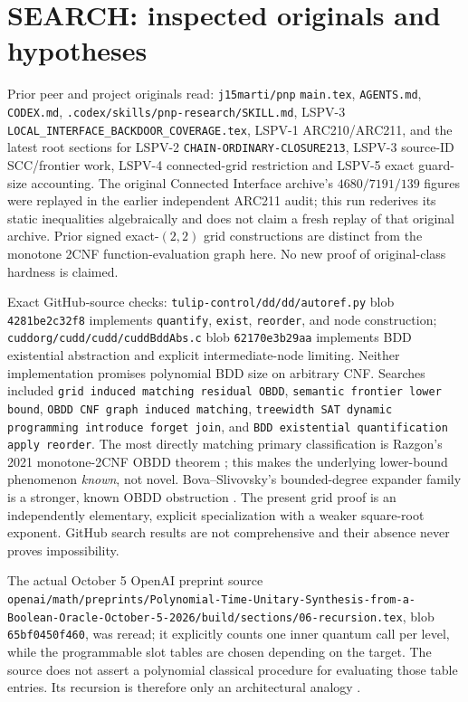 \documentclass[11pt]{article}
\begin{document}
\section{SEARCH: inspected originals and hypotheses}
\noindent Prior peer and project originals read: \texttt{j15marti/pnp} \texttt{main.tex}, \texttt{AGENTS.md}, \texttt{CODEX.md}, \texttt{.codex/skills/pnp-research/SKILL.md}, LSPV-3 \texttt{LOCAL\_INTERFACE\_BACKDOOR\_COVERAGE.tex}, LSPV-1 ARC210/ARC211, and the latest root sections for LSPV-2 \texttt{CHAIN-ORDINARY-CLOSURE213}, LSPV-3 source-ID SCC/frontier work, LSPV-4 connected-grid restriction and LSPV-5 exact guard-size accounting. The original Connected Interface archive's $4680/7191/139$ figures were replayed in the earlier independent ARC211 audit; this run rederives its static inequalities algebraically and does not claim a fresh replay of that original archive. Prior signed exact-$(2,2)$ grid constructions are distinct from the monotone 2CNF function-evaluation graph here. No new proof of original-class hardness is claimed.

\noindent Exact GitHub-source checks: \texttt{tulip-control/dd/dd/autoref.py} blob \texttt{4281be2c32f8} implements \texttt{quantify}, \texttt{exist}, \texttt{reorder}, and node construction; \texttt{cuddorg/cudd/cudd/cuddBddAbs.c} blob \texttt{62170e3b29aa} implements BDD existential abstraction and explicit intermediate-node limiting. Neither implementation promises polynomial BDD size on arbitrary CNF. Searches included \texttt{grid induced matching residual OBDD}, \texttt{semantic frontier lower bound}, \texttt{OBDD CNF graph induced matching}, \texttt{treewidth SAT dynamic programming introduce forget join}, and \texttt{BDD existential quantification apply reorder}. The most directly matching primary classification is Razgon's 2021 monotone-2CNF OBDD theorem \cite{razgon21}; this makes the underlying lower-bound phenomenon \emph{known}, not novel. Bova--Slivovsky's bounded-degree expander family is a stronger, known OBDD obstruction \cite{bova17}. The present grid proof is an independently elementary, explicit specialization with a weaker square-root exponent. GitHub search results are not comprehensive and their absence never proves impossibility.

\noindent The actual October 5 OpenAI preprint source \texttt{openai/math/preprints/Polynomial-Time-Unitary-Synthesis-from-a-Boolean-Oracle-October-5-2026/build/sections/06-recursion.tex}, blob \texttt{65bf0450f460}, was reread; it explicitly counts one inner quantum call per level, while the programmable slot tables are chosen depending on the target. The source does not assert a polynomial classical procedure for evaluating those table entries. Its recursion is therefore only an architectural analogy \cite{openai26}.
\end{document}
